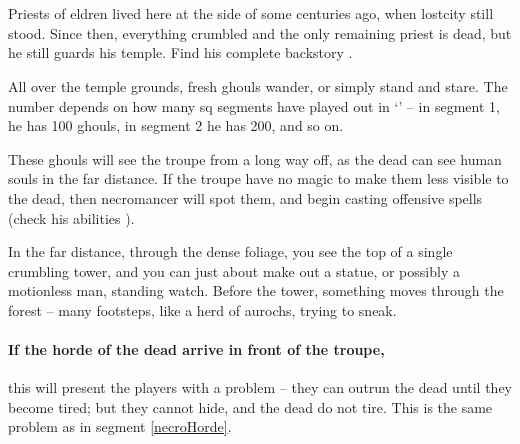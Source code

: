 \section{}
\label{necromancers_lair}


\begin{multicols}{2}


\noindent
Priests of \gls{eldren} lived here at the side of  some centuries ago, when \gls{lostcity} still stood.
Since then, everything crumbled and the only remaining priest is dead, but he still guards his temple.
Find his complete backstory .

All over the temple grounds, fresh ghouls wander, or simply stand and stare.
The number depends on how many \gls{sq} \glspl{segment} have played out in `' -- in \gls{segment} 1, he has 100 ghouls, in \gls{segment} 2 he has 200, and so on.

These ghouls will see the troupe from a long way off, as the dead can see human souls in the far distance.
If the troupe have no magic to make them less visible to the dead, then \gls{necromancer} will spot them, and begin \gls{casting} offensive spells (check his abilities ).

\begin{boxtext}
  In the far distance, through the dense foliage, you see the top of a single crumbling tower, and you can just about make out a statue, or possibly a motionless man, standing watch.
  Before the tower, something moves through the forest -- many footsteps, like a herd of aurochs, trying to sneak.
\end{boxtext}

\paragraph{If the horde of the dead arrive in front of the troupe,}
this will present the players with a problem -- they can outrun the dead until they become tired; but they cannot hide, and the dead do not tire.
This is the same problem as in \gls{segment} \vref{necroHorde}.


\end{multicols}
